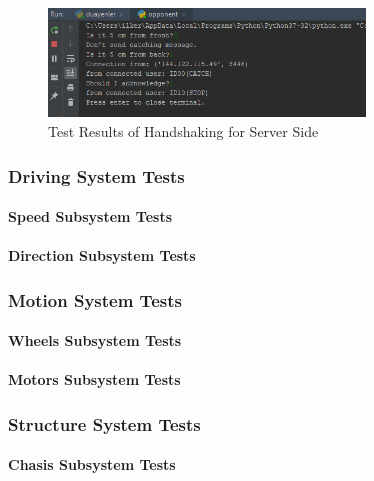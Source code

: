 \documentclass[a4paper,12pt]{article}
\begin{document}
		\begin{figure}[H]
			\center
			\setlength{\unitlength}{\textwidth} 
			\includegraphics[width=0.75\textwidth]{images/handshake2}
			\caption{\label{fig:handshake2}Test Results of Handshaking for Server Side}
		\end{figure}			
			
	
	\subsubsection{Driving System Tests}
	
	\paragraph{Speed Subsystem Tests}	
		
	\paragraph{Direction Subsystem Tests}


	\subsubsection{Motion System Tests}
	
	\paragraph{Wheels Subsystem Tests}	
		
	\paragraph{Motors Subsystem Tests}
	
	
	\subsubsection{Structure System Tests}
	
	\paragraph{Chasis Subsystem Tests}	
		
\end{document}
